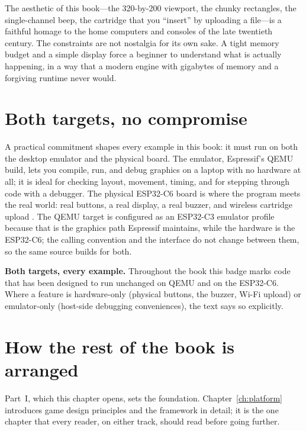 \begin{prgaside}
The aesthetic of this book---the 320-by-200 viewport, the chunky rectangles, the
single-channel beep, the cartridge that you ``insert'' by uploading a
 file---is a faithful homage to the home computers and consoles of
the late twentieth century. The constraints are not nostalgia for its own sake.
A tight memory budget and a simple display force a beginner to understand what is
actually happening, in a way that a modern engine with gigabytes of memory and a
forgiving runtime never would.
\end{prgaside}

\section{Both targets, no compromise}

A practical commitment shapes every example in this book: it must run on both the
desktop emulator and the physical board. The emulator, Espressif's QEMU build,
lets you compile, run, and debug graphics on a laptop with no hardware at all; it
is ideal for checking layout, movement, timing, and for stepping through code
with a debugger. The physical ESP32\nobreakdash-C6 board is where the program meets the
real world: real buttons, a real display, a real buzzer, and wireless cartridge
upload \citep{prg32qemu}. The QEMU target is configured as an ESP32\nobreakdash-C3 emulator
profile because that is the \riscv graphics path Espressif maintains, while the
hardware is the ESP32\nobreakdash-C6; the \riscv calling convention and the \prg interface
do not change between them, so the same source builds for both.

\begin{prgtargets}
\textbf{Both targets, every example.} Throughout the book this badge marks code
that has been designed to run unchanged on QEMU and on the ESP32\nobreakdash-C6. Where a
feature is hardware-only (physical buttons, the buzzer, Wi-Fi upload) or
emulator-only (host-side debugging conveniences), the text says so explicitly.
\end{prgtargets}

\section{How the rest of the book is arranged}

Part~I, which this chapter opens, sets the foundation. Chapter~\ref{ch:platform}
introduces game design principles and the \prg framework in detail; it is the one
chapter that every reader, on either track, should read before going further.

